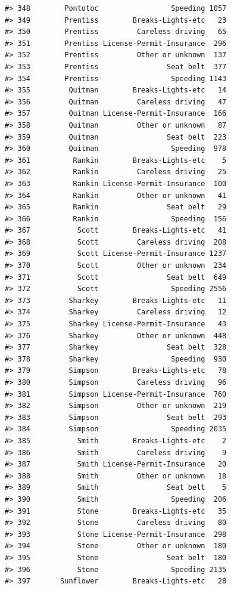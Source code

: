 \documentclass[
]{book}
\begin{document}
\begin{verbatim}
#> 348        Pontotoc                 Speeding 1057
#> 349        Prentiss        Breaks-Lights-etc   23
#> 350        Prentiss         Careless driving   65
#> 351        Prentiss License-Permit-Insurance  296
#> 352        Prentiss         Other or unknown  137
#> 353        Prentiss                Seat belt  377
#> 354        Prentiss                 Speeding 1143
#> 355         Quitman        Breaks-Lights-etc   14
#> 356         Quitman         Careless driving   47
#> 357         Quitman License-Permit-Insurance  166
#> 358         Quitman         Other or unknown   87
#> 359         Quitman                Seat belt  223
#> 360         Quitman                 Speeding  978
#> 361          Rankin        Breaks-Lights-etc    5
#> 362          Rankin         Careless driving   25
#> 363          Rankin License-Permit-Insurance  100
#> 364          Rankin         Other or unknown   41
#> 365          Rankin                Seat belt   29
#> 366          Rankin                 Speeding  156
#> 367           Scott        Breaks-Lights-etc   41
#> 368           Scott         Careless driving  208
#> 369           Scott License-Permit-Insurance 1237
#> 370           Scott         Other or unknown  234
#> 371           Scott                Seat belt  649
#> 372           Scott                 Speeding 2556
#> 373         Sharkey        Breaks-Lights-etc   11
#> 374         Sharkey         Careless driving   12
#> 375         Sharkey License-Permit-Insurance   43
#> 376         Sharkey         Other or unknown  448
#> 377         Sharkey                Seat belt  328
#> 378         Sharkey                 Speeding  930
#> 379         Simpson        Breaks-Lights-etc   78
#> 380         Simpson         Careless driving   96
#> 381         Simpson License-Permit-Insurance  760
#> 382         Simpson         Other or unknown  219
#> 383         Simpson                Seat belt  293
#> 384         Simpson                 Speeding 2035
#> 385           Smith        Breaks-Lights-etc    2
#> 386           Smith         Careless driving    9
#> 387           Smith License-Permit-Insurance   20
#> 388           Smith         Other or unknown   18
#> 389           Smith                Seat belt    5
#> 390           Smith                 Speeding  206
#> 391           Stone        Breaks-Lights-etc   35
#> 392           Stone         Careless driving   80
#> 393           Stone License-Permit-Insurance  298
#> 394           Stone         Other or unknown  180
#> 395           Stone                Seat belt  180
#> 396           Stone                 Speeding 2135
#> 397       Sunflower        Breaks-Lights-etc   28

\end{verbatim}
\end{document}
